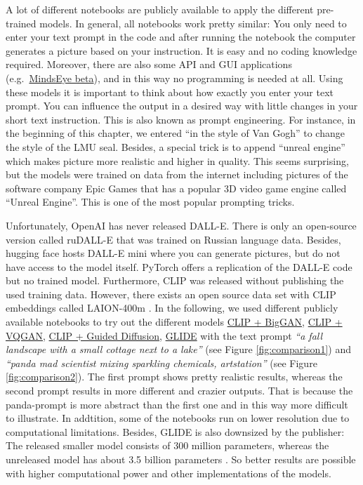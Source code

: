 \documentclass[
]{krantz}
\begin{document}
A lot of different notebooks are publicly available to apply the different pre-trained models. In general, all notebooks work pretty similar: You only need to enter your text prompt in the code and after running the notebook the computer generates a picture based on your instruction. It is easy and no coding knowledge required. Moreover, there are also some API and GUI applications (e.g.~\href{https://multimodal.art/mindseye}{MindsEye beta}), and in this way no programming is needed at all. Using these models it is important to think about how exactly you enter your text prompt. You can influence the output in a desired way with little changes in your short text instruction. This is also known as prompt engineering. For instance, in the beginning of this chapter, we entered ``in the style of Van Gogh'' to change the style of the LMU seal. Besides, a special trick is to append ``unreal engine'' \citep{unrealEngine} which makes picture more realistic and higher in quality. This seems surprising, but the models were trained on data from the internet including pictures of the software company Epic Games that has a popular 3D video game engine called ``Unreal Engine''. This is one of the most popular prompting tricks.

Unfortunately, OpenAI has never released DALL-E. There is only an open-source version called ruDALL-E \citep{ruDALLE} that was trained on Russian language data. Besides, hugging face hosts DALL-E mini \citep{DALLEmini} where you can generate pictures, but do not have access to the model itself. PyTorch offers a replication of the DALL-E code \citep{DALLEpytorch} but no trained model. Furthermore, CLIP was released without publishing the used training data. However, there exists an open source data set with CLIP embeddings called LAION-400m \citep{LAION}. In the following, we used different publicly available notebooks to try out the different models \href{https://colab.research.google.com/drive/1NCceX2mbiKOSlAd_o7IU7nA9UskKN5WR?usp=sharing}{CLIP + BigGAN},
\href{https://colab.research.google.com/drive/1ZAus_gn2RhTZWzOWUpPERNC0Q8OhZRTZ\#scrollTo=FhhdWrSxQhwg}{CLIP + VQGAN},
\href{https://colab.research.google.com/drive/12a_Wrfi2_gwwAuN3VvMTwVMz9TfqctNj\#scrollTo=X5gODNAMEUCR}{CLIP + Guided Diffusion},
\href{https://colab.research.google.com/github/openai/glide-text2im/blob/main/notebooks/text2im.ipynb}{GLIDE}
with the text prompt \emph{``a fall landscape with a small cottage next to a lake''} (see Figure \ref{fig:comparison1}) and \emph{``panda mad scientist mixing sparkling chemicals, artstation''} (see Figure \ref{fig:comparison2}). The first prompt shows pretty realistic results, whereas the second prompt results in more different and crazier outputs. That is because the panda-prompt is more abstract than the first one and in this way more difficult to illustrate. In addtition, some of the notebooks run on lower resolution due to computational limitations. Besides, GLIDE is also downsized by the publisher: The released smaller model consists of 300 million parameters, whereas the unreleased model has about 3.5 billion parameters \citep{GLIDE}. So better results are possible with higher computational power and other implementations of the models.
\end{document}
